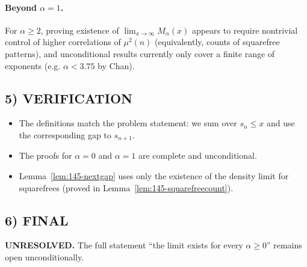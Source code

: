 \paragraph{Beyond $\alpha=1$.}
For $\alpha\ge 2$, proving existence of $\lim_{x\to\infty}M_{\alpha}(x)$ appears to require nontrivial control of higher correlations of $\mu^2(n)$ (equivalently, counts of squarefree patterns), and unconditional results currently only cover a finite range of exponents (e.g. $\alpha<3.75$ by Chan).

\subsection*{5) VERIFICATION}
\begin{itemize}
\item The definitions match the problem statement: we sum over $s_n\le x$ and use the corresponding gap to $s_{n+1}$.
\item The proofs for $\alpha=0$ and $\alpha=1$ are complete and unconditional.
\item Lemma~\ref{lem:145-nextgap} uses only the existence of the density limit for squarefrees (proved in Lemma~\ref{lem:145-squarefreecount}).
\end{itemize}

\subsection*{6) FINAL}
\textbf{UNRESOLVED.} The full statement ``the limit exists for every $\alpha\ge 0$'' remains open unconditionally.

